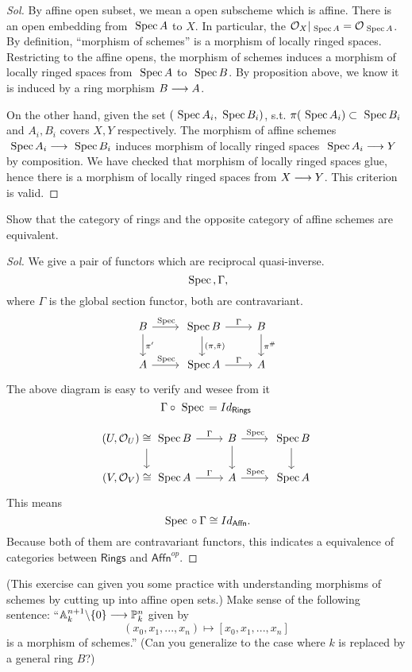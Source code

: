 \documentclass[11pt]{book} %
\begin{document}
\begin{proof}[Sol]
By affine open subset, we mean a open subscheme which is affine. There is an open embedding from $\text{ Spec\,} A$ to $X$. In particular, the ${\cal O}_X|_{\text{ Spec\,} A}={\cal O}_{\text{ Spec\,} A}$. By definition,  ``morphism of schemes'' is a morphism of locally ringed spaces. Restricting to the affine opens, the morphism of schemes induces a morphism of locally ringed spaces from $\text{ Spec\,} A$ to $\text{ Spec\,} B$. By proposition above, we know it is induced by a ring morphism $B\longrightarrow A$.


On the other hand, given the set $(\text{ Spec\,} A_i,\text{ Spec\,} B_i)$, s.t. $\pi(\text{ Spec\,} A_i)\subset\text{ Spec\,} B_i$ and $A_i, B_i$ covers $X, Y$ respectively. 
The morphism of affine schemes $\text{ Spec\,} A_i\longrightarrow \text{ Spec\,} B_i$ induces morphism of locally ringed spaces $\text{ Spec\,} A_i\longrightarrow Y$ by composition. 
We have checked that morphism of locally ringed spaces glue, hence there is a morphism of locally ringed spaces from $X\longrightarrow Y$. This criterion is valid.
\end{proof}
\begin{exr}
Show that the category of rings and the opposite category of affine schemes are equivalent.
\end{exr}
\begin{proof}[Sol]
We give a pair of functors which are reciprocal quasi-inverse.
$$
\text{ Spec\,} ,\Gamma,
$$
where $\Gamma$ is the global section functor, both are contravariant.
$$
\begin{tikzcd}
B \arrow[r, "\spec"] \arrow[d, "\pi'"] & \spec B \arrow[r, "\Gamma"] \arrow[d, "{(\pi,\tilde{\pi})}"] & B \arrow[d, "\pi^\#"] \\
A \arrow[r, "\spec"] & \spec A \arrow[r, "\Gamma"] & A
\end{tikzcd}
$$
The above diagram is easy to verify and wesee from it
$$
\Gamma\circ \text{ Spec\,} =Id_{\mathsf{Rings}}
$$

$$
\begin{tikzcd}
(U,\calo_U)\cong \spec B \arrow[r, "\Gamma"] \arrow[d] & B \arrow[r, "\spec "] \arrow[d] & \spec B \arrow[d] \\
(V,\calo_V)\cong\spec A \arrow[r, "\Gamma"] & A \arrow[r, "\spec"] & \spec A
\end{tikzcd}
$$
This means
$$
\text{ Spec\,}\circ \Gamma\cong Id_{\mathsf{Affn}}.
$$
Because both of them are contravariant functors, this indicates a equivalence of categories between $\mathsf{Rings}$ and $\mathsf{Affn}^{op}$.

\end{proof}
\begin{exr}
(This exercise can given you some practice with understanding morphisms of schemes by cutting up into affine open sets.) Make sense of the following sentence: ``$ \mathbb A^{n+1}_k\backslash \{0\}\longrightarrow \mathbb P^n_k$ given by 
$$
(x_0,x_1,...,x_n)\mapsto[x_0,x_1,...,x_n]
$$
is a morphism of schemes.''
(Can you generalize to the case where $k$ is replaced by a general ring $B$?)
\end{exr}
\end{document}
